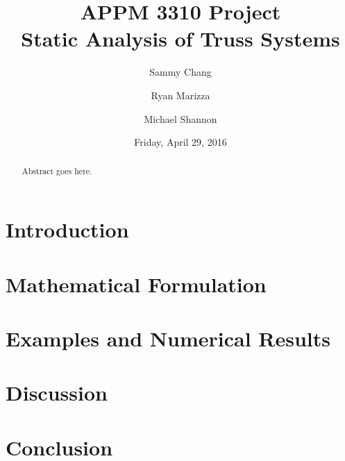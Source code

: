 \documentclass{article}
\title{APPM 3310 Project\\\Large{Static Analysis of Truss Systems}}
\author{Sammy Chang\and{}Ryan Marizza\and{}Michael Shannon}
\date{Friday, April 29, 2016}
\begin{document}
\maketitle


\begin{abstract}
    Abstract goes here.
\end{abstract}


\section{Introduction}


\section{Mathematical Formulation}


\section{Examples and Numerical Results}


\section{Discussion}


\section{Conclusion}


\nocite{*}
\printbibliography{}
\end{document}
